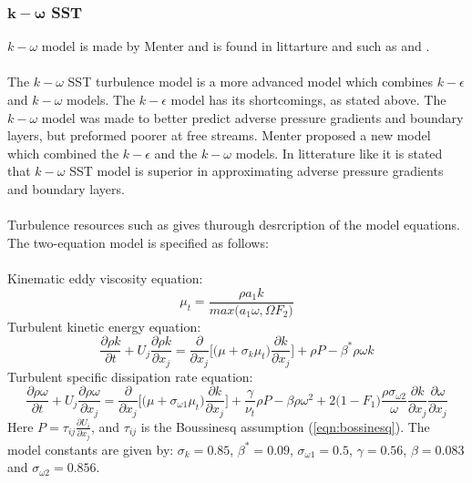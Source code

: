 \documentclass[a4paper, 12pt]{report}
\begin{document}
\subsubsection{$\boldsymbol{k}-\boldsymbol{\omega}$ SST}
$k-\omega$ model is made by Menter \cite{SST} and is found in littarture and such as \cite{CFD} and \cite{Wilcox}.\\
\\
The $k-\omega$ SST turbulence model is a more advanced model which combines $k-\epsilon$ and $k-\omega$ models. The $k-\epsilon$ model has its shortcomings, as stated above. The $k-\omega$ model was made to better predict adverse pressure gradients and boundary layers, but preformed poorer at free streams. Menter \cite{reviewOfSSTModel} proposed a new model which combined the $k-\epsilon$ and the $k-\omega$ models. In litterature like \cite{CFD} it is stated that $k-\omega$ SST model is superior in approximating adverse pressure gradients and boundary layers.\\
\\
Turbulence resources such as \cite{NASA_SST} gives thurough desrcription of the model equations. The two-equation model is specified as follows:\\
\\
Kinematic eddy viscosity equation:
\begin{equation}
\mu_t = \frac{\rho a_1 k}{max\big(a_1\omega, \Omega F_2\big)}
\label{eqn:kOmegaSSTTurbulentViscosity}
\end{equation}
Turbulent kinetic energy equation:
\begin{equation}
\frac{\partial \rho k}{\partial t} + U_j \frac{\partial \rho k}{\partial x_j} = \frac{\partial }{\partial x_j}\Big[\big(\mu + \sigma_k\mu_t\big)\frac{\partial k}{\partial x_j} \Big] + \rho P - \beta^* \rho \omega k
\label{eqn:kOmegaSSTKequation}
\end{equation}
Turbulent specific dissipation rate equation:
\begin{equation}
\frac{\partial \rho \omega}{\partial t} + U_j \frac{\partial \rho \omega}{\partial x_j} =
\frac{\partial }{\partial x_j}\Big[\big(\mu + \sigma_{\omega 1}\mu_t\big)\frac{\partial k}{\partial x_j} \Big] + \frac{\gamma}{\nu_t} \rho P - \beta \rho \omega^2 + 2\big(1 -F_1\big)\frac{\rho \sigma_{\omega 2}}{\omega}\frac{\partial k}{\partial x_j}\frac{\partial \omega}{\partial x_j}
\label{eqn:kOmegaSSTOmegaequation}
\end{equation}
Here $P = \tau_{ij}\frac{\partial U_i}{\partial x_j}$, and $\tau_{ij}$ is the Boussinesq assumption (\ref{eqn:bossinesq}). The model constants are given by: $\sigma_k = 0.85$, $\beta^* = 0.09$, $\sigma_{\omega 1} = 0.5$, $\gamma = 0.56$, $\beta = 0.083$ and $\sigma_{\omega 2} = 0.856$.\\
\end{document}
